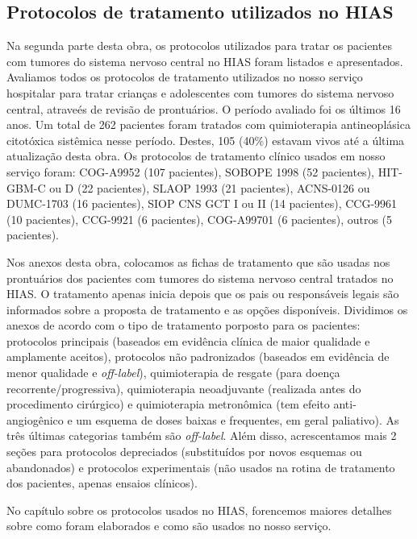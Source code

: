\documentclass[11pt,a4paper,oldfontcommands]{memoir}
\begin{document}
\subsection{Protocolos de tratamento utilizados no HIAS}

Na segunda parte desta obra, os protocolos utilizados para tratar os pacientes com tumores do sistema nervoso central no HIAS foram listados e apresentados. Avaliamos todos os protocolos de tratamento utilizados no nosso serviço hospitalar para tratar crianças e adolescentes com tumores do sistema nervoso central, atraveés de revisão de prontuários. O período avaliado foi os últimos 16 anos. Um total de 262 pacientes foram tratados com quimioterapia antineoplásica citotóxica sistêmica nesse período. Destes, 105 (40\%) estavam vivos até a última atualização desta obra. Os protocolos de tratamento clínico usados em nosso serviço foram: COG-A9952 \cite{Ater20072012} (107 pacientes), SOBOPE 1998 (52 pacientes), HIT-GBM-C ou D \cite{Wolff2011} (22 pacientes), SLAOP 1993 \cite{slaop1} (21 pacientes), ACNS-0126 \cite{noq191} ou DUMC-1703 (16 pacientes), SIOP CNS GCT I ou II (14 pacientes), CCG-9961 \cite{4980} (10 pacientes), CCG-9921 \cite{095} (6 pacientes), COG-A99701 \cite{2792} (6 pacientes), outros (5 pacientes). 

Nos anexos desta obra, colocamos as fichas de tratamento que são usadas nos prontuários dos pacientes com tumores do sistema nervoso central tratados no HIAS. O tratamento apenas inicia depois que os pais ou responsáveis legais são informados sobre a proposta de tratamento e as opções disponíveis. Dividimos os anexos de acordo com o tipo de tratamento porposto para os pacientes: protocolos principais (baseados em evidência clínica de maior qualidade e amplamente aceitos), protocolos não padronizados (baseados em evidência de menor qualidade e \textit{off-label}), quimioterapia de resgate (para doença recorrente/progressiva), quimioterapia neoadjuvante (realizada antes do procedimento cirúrgico) e quimioterapia metronômica (tem efeito anti-angiogênico e um esquema de doses baixas e frequentes, em geral paliativo). As três últimas categorias também são \textit{off-label}. Além disso, acrescentamos mais 2 seções para protocolos depreciados (substituídos por novos esquemas ou abandonados) e protocolos experimentais (não usados na rotina de tratamento dos pacientes, apenas ensaios clínicos).

No capítulo sobre os protocolos usados no HIAS, forencemos maiores detalhes sobre como foram elaborados e como são usados no nosso serviço.
\end{document}
